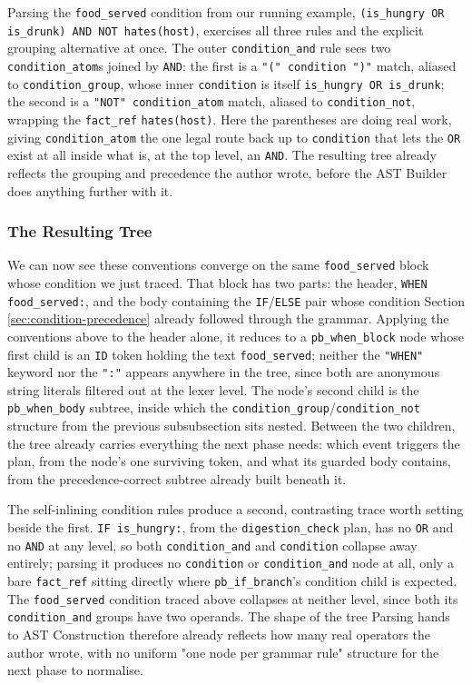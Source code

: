 Parsing the \lstinline|food_served| condition from our running example, \lstinline|(is_hungry OR is_drunk) AND NOT hates(host)|, exercises all three rules and the explicit grouping alternative at once. The outer \lstinline|condition_and| rule sees two \lstinline|condition_atom|s joined by \lstinline|AND|: the first is a \lstinline|"(" condition ")"| match, aliased to \lstinline|condition_group|, whose inner \lstinline|condition| is itself \lstinline|is_hungry OR is_drunk|; the second is a \lstinline|"NOT" condition_atom| match, aliased to \lstinline|condition_not|, wrapping the \lstinline|fact_ref| \lstinline|hates(host)|. Here the parentheses are doing real work, giving \lstinline|condition_atom| the one legal route back up to \lstinline|condition| that lets the \lstinline|OR| exist at all inside what is, at the top level, an \lstinline|AND|. The resulting tree already reflects the grouping and precedence the author wrote, before the AST Builder does anything further with it.

\subsubsection{The Resulting Tree}
We can now see these conventions converge on the same \lstinline|food_served| block whose condition we just traced. That block has two parts: the header, \lstinline|WHEN food_served:|, and the body containing the \lstinline|IF|/\lstinline|ELSE| pair whose condition Section \ref{sec:condition-precedence} already followed through the grammar. Applying the conventions above to the header alone, it reduces to a \lstinline|pb_when_block| node whose first child is an \lstinline|ID| token holding the text \lstinline|food_served|; neither the \lstinline|"WHEN"| keyword nor the \lstinline|":"| appears anywhere in the tree, since both are anonymous string literals filtered out at the lexer level. The node's second child is the \lstinline|pb_when_body| subtree, inside which the \lstinline|condition_group|/\lstinline|condition_not| structure from the previous subsubsection sits nested. Between the two children, the tree already carries everything the next phase needs: which event triggers the plan, from the node's one surviving token, and what its guarded body contains, from the precedence-correct subtree already built beneath it.

The self-inlining condition rules produce a second, contrasting trace worth setting beside the first. \lstinline|IF is_hungry:|, from the \lstinline|digestion_check| plan, has no \lstinline|OR| and no \lstinline|AND| at any level, so both \lstinline|condition_and| and \lstinline|condition| collapse away entirely; parsing it produces no \lstinline|condition| or \lstinline|condition_and| node at all, only a bare \lstinline|fact_ref| sitting directly where \lstinline|pb_if_branch|'s condition child is expected. The \lstinline|food_served| condition traced above collapses at neither level, since both its \lstinline|condition_and| groups have two operands. The shape of the tree Parsing hands to AST Construction therefore already reflects how many real operators the author wrote, with no uniform "one node per grammar rule" structure for the next phase to normalise.

